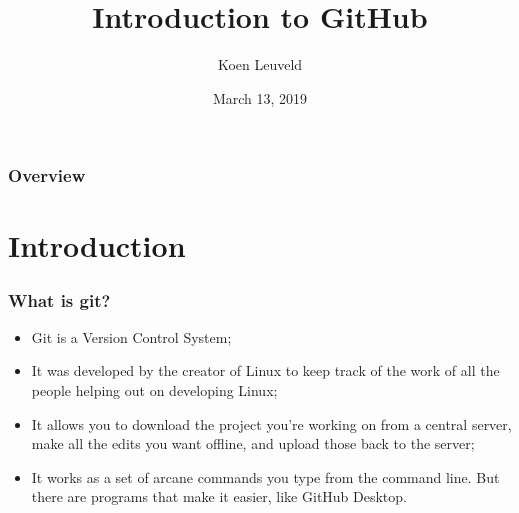 \documentclass{beamer}
\title[Git]{Introduction to GitHub} %
\author{Koen Leuveld} %
\institute[EDI] %
{
EDI \\ %
\medskip
\textit{k.leuveld@surveybe.com} %
}
\date{March 13, 2019} %
\begin{document}
\begin{frame}
\titlepage %
\end{frame}

\begin{frame}
\frametitle{Overview} %
\tableofcontents %
\end{frame}


\section{Introduction} %


\begin{frame}
\frametitle{What is git?}
	\begin{itemize}
		\item Git is a Version Control System;
		\item It was developed by the creator of Linux to keep track of the work of all the people helping out on developing Linux;
		\item It allows you to download the project you’re working on from a central server, make all the edits you want offline, and upload those back to the server;
		\item It works as a set of arcane commands you type from the command line. But there are programs that make it easier, like GitHub Desktop.
	\end{itemize}
\end{frame}
\end{document}
